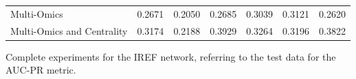 \documentclass[ppgc, diss, english]{iiufrgs}
\begin{document}
\begin{landscape}
\begin{table}[!th]
\begin{adjustbox}{scale=0.8,center}
\begin{tabular}{lllllll}
Multi-Omics                & 0.2671        & 0.2050        & 0.2685                            & 0.3039                     & 0.3121                   & 0.2620                   \\
Multi-Omics and Centrality & 0.3174        & 0.2188        & 0.3929                            & 0.3264                     & 0.3196                   & 0.3822                   \\ \hline
\end{tabular}

\end{adjustbox}

\end{table}
\end{landscape}




\begin{landscape}

\begin{table}[!th]
\caption{Complete experiments for the IREF network, referring to the test data for the AUC-PR metric. \label{tab:completa_iref}}
\centering
 \begin{adjustbox}{scale=0.8,center}


\end{adjustbox}
\end{table}
\end{landscape}
\end{document}
